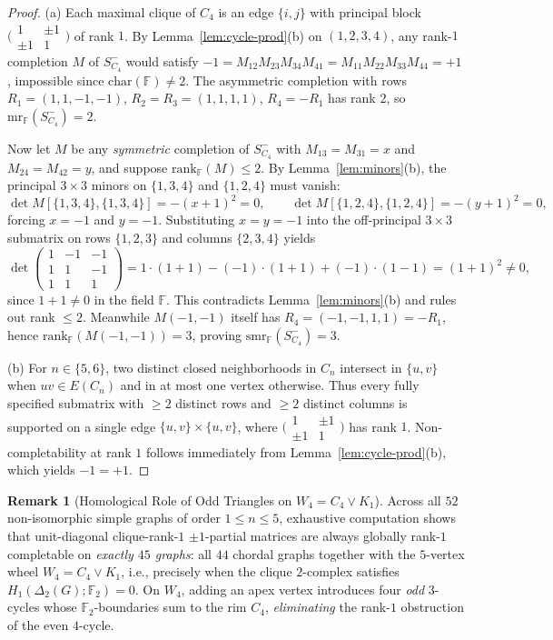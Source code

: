 \documentclass[11pt]{article}
\theoremstyle{definition}
\newtheorem{remark}[theorem]{Remark}
\newcommand{\F}{\mathbb{F}}
\newcommand{\mr}{\mathrm{mr}}
\newcommand{\smr}{\mathrm{smr}}
\newcommand{\rk}{\mathrm{rank}}
\begin{document}
\begin{proof}
(a) Each maximal clique of $C_4$ is an edge $\{i,j\}$ with principal block $\bigl(\begin{smallmatrix}1 & \pm 1\\ \pm 1 & 1\end{smallmatrix}\bigr)$ of rank $1$. By Lemma~\ref{lem:cycle-prod}(b) on $(1,2,3,4)$, any rank-$1$ completion $M$ of $S_{C_4}^-$ would satisfy $-1 = M_{12}M_{23}M_{34}M_{41} = M_{11}M_{22}M_{33}M_{44} = +1$, impossible since $\mathrm{char}(\F)\neq 2$. The asymmetric completion with rows $R_1=(1,1,-1,-1)$, $R_2=R_3=(1,1,1,1)$, $R_4=-R_1$ has rank $2$, so $\mr_{\F}(S_{C_4}^-)=2$.

Now let $M$ be any \emph{symmetric} completion of $S_{C_4}^-$ with $M_{13}=M_{31}=x$ and $M_{24}=M_{42}=y$, and suppose $\rk_{\F}(M)\le 2$. By Lemma~\ref{lem:minors}(b), the principal $3\times 3$ minors on $\{1,3,4\}$ and $\{1,2,4\}$ must vanish:
\[
\det M[\{1,3,4\},\{1,3,4\}] = -(x+1)^2 = 0, \qquad
\det M[\{1,2,4\},\{1,2,4\}] = -(y+1)^2 = 0,
\]
forcing $x = -1$ and $y = -1$. Substituting $x=y=-1$ into the off-principal $3\times 3$ submatrix on rows $\{1,2,3\}$ and columns $\{2,3,4\}$ yields
\[
\det\begin{pmatrix} 1 & -1 & -1 \\ 1 & 1 & -1 \\ 1 & 1 & 1 \end{pmatrix}
= 1\cdot(1+1) - (-1)\cdot(1+1) + (-1)\cdot(1-1) = (1+1)^2 \neq 0,
\]
since $1+1 \neq 0$ in the field $\F$. This contradicts Lemma~\ref{lem:minors}(b) and rules out rank $\le 2$. Meanwhile $M(-1,-1)$ itself has $R_4 = (-1,-1,1,1) = -R_1$, hence $\rk_{\F}(M(-1,-1)) = 3$, proving $\smr_{\F}(S_{C_4}^-) = 3$.

(b) For $n \in \{5,6\}$, two distinct closed neighborhoods in $C_n$ intersect in $\{u,v\}$ when $uv\in E(C_n)$ and in at most one vertex otherwise. Thus every fully specified submatrix with $\ge 2$ distinct rows and $\ge 2$ distinct columns is supported on a single edge $\{u,v\}\times\{u,v\}$, where $\bigl(\begin{smallmatrix}1 & \pm 1\\ \pm 1 & 1\end{smallmatrix}\bigr)$ has rank $1$. Non-completability at rank $1$ follows immediately from Lemma~\ref{lem:cycle-prod}(b), which yields $-1 = +1$.
\end{proof}

\begin{remark}[Homological Role of Odd Triangles on $W_4 = C_4 \vee K_1$]
Across all $52$ non-isomorphic simple graphs of order $1 \le n \le 5$, exhaustive computation shows that unit-diagonal clique-rank-$1$ $\pm 1$-partial matrices are always globally rank-$1$ completable on \emph{exactly $45$ graphs}: all $44$ chordal graphs together with the $5$-vertex wheel $W_4 = C_4 \vee K_1$, i.e., precisely when the clique $2$-complex satisfies $H_1(\Delta_2(G);\F_2) = 0$. On $W_4$, adding an apex vertex introduces four \emph{odd} $3$-cycles whose $\F_2$-boundaries sum to the rim $C_4$, \emph{eliminating} the rank-$1$ obstruction of the even $4$-cycle.
\end{remark}
\end{document}
